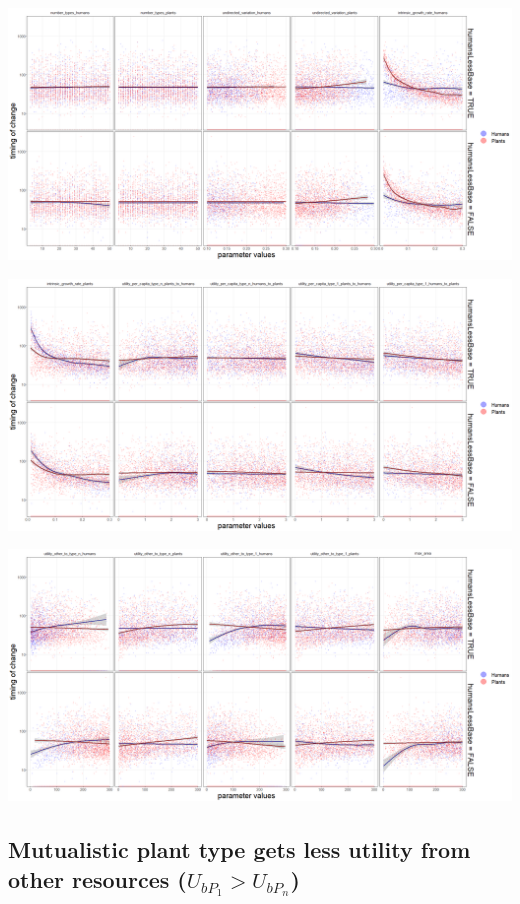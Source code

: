 \documentclass[
]{book}
\begin{document}
\includegraphics[width=1\linewidth]{plots/5_LHS_humansLessBase_timing_bifurcationPlot_twoVariables_per_parameter_and_scenario_part1}

\includegraphics[width=1\linewidth]{plots/5_LHS_humansLessBase_timing_bifurcationPlot_twoVariables_per_parameter_and_scenario_part2}

\includegraphics[width=1\linewidth]{plots/5_LHS_humansLessBase_timing_bifurcationPlot_twoVariables_per_parameter_and_scenario_part3}

\newpage

\hypertarget{mutualistic-plant-type-gets-less-utility-from-other-resources-u_bp_1u_bp_n}{%
\subsection{\texorpdfstring{Mutualistic plant type gets less utility from other resources (\(U_{bP_{1}}>U_{bP_{n}}\))}{Mutualistic plant type gets less utility from other resources (U\_\{bP\_\{1\}\}\textgreater U\_\{bP\_\{n\}\})}}\label{mutualistic-plant-type-gets-less-utility-from-other-resources-u_bp_1u_bp_n}}
\end{document}

